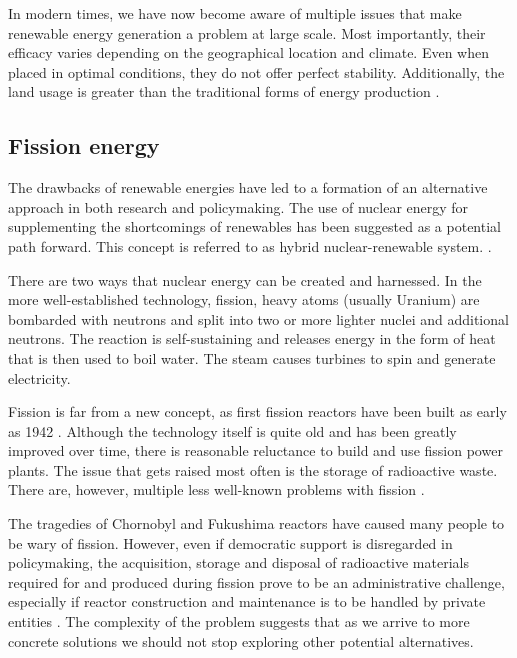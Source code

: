 In modern times, we have now become aware of multiple issues
that make renewable energy generation a problem at large scale.
Most importantly, their efficacy varies depending on the geographical
location and climate. Even when placed in optimal conditions,
they do not offer perfect stability. Additionally, the land
usage is greater than the traditional forms of energy production
\cite{renewable_problems}.

\subsection{Fission energy}

The drawbacks of renewable energies have led to a formation
of an alternative approach in both research and policymaking. 
The use of nuclear energy for supplementing the shortcomings 
of renewables has been suggested as a potential path forward.
This concept is referred to as hybrid nuclear-renewable system.
\cite{hybrid_nuclear_renewable}. 

There are two ways that nuclear energy can be created and harnessed.
In the more well-established technology, fission, heavy atoms 
(usually Uranium) are bombarded with neutrons 
and split into two or more lighter nuclei and
additional neutrons. The reaction is self-sustaining 
and releases energy in the form of heat that is then used
to boil water. The steam causes turbines to spin
and generate electricity.


Fission is far from a new concept, as first fission reactors have been 
built as early as 1942 \cite{first_fission_reactor}. 
Although the technology itself is quite old 
and has been greatly improved over time, 
there is reasonable reluctance to build and use fission power plants. 
The issue that gets raised most often is the storage of radioactive waste. 
There are, however, multiple less well-known
problems with fission \cite{fission_problems}. 


The tragedies of Chornobyl and Fukushima reactors
have caused many people to be wary of fission. However, even if
democratic support is disregarded in policymaking, the acquisition,
storage and disposal of radioactive materials required for and produced 
during fission prove to be an administrative challenge, especially 
if reactor construction and maintenance is to be handled
by private entities \cite{fission_tech_and_current_issues}. 
The complexity of the problem suggests that 
as we arrive to more concrete solutions we 
should not stop exploring other potential alternatives.


